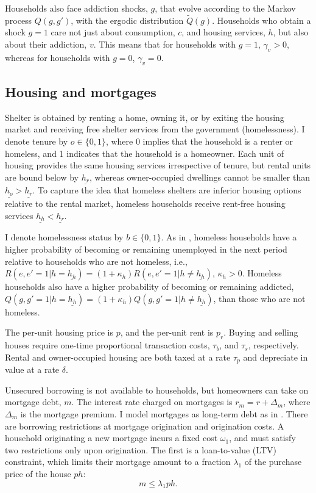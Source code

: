 \documentclass[parskip=full]{article}
\begin{document}
Households also face addiction shocks, $g$, that evolve according to the Markov process $Q(g,g')$, with the ergodic distribution $\tilde{Q}(g)$. Households who obtain a shock $g=1$ care not just about consumption, $c$, and housing services, $h$, but also about their addiction, $v$. This means that for households with $g=1$, $\gamma_{v}>0$, whereas for households with $g=0$, $\gamma_{v}=0$.

\subsection{Housing and mortgages}
Shelter is obtained by renting a home, owning it, or by exiting the housing market and receiving free shelter services from the government (homelessness). I denote tenure by $o\in\{0,1\}$, where 0 implies that the household is a renter or homeless, and 1 indicates that the household is a homeowner. Each unit of housing provides the same housing services irrespective of tenure, but rental units are bound below by $\underline{{h}_r}$, whereas owner-occupied dwellings cannot be smaller than $\underline{{h}_o}>\underline{{h}_r}$. To capture the idea that homeless shelters are inferior housing options relative to the rental market, homeless households receive rent-free housing services $\underline{{h}_h}<\underline{{h}_r}$. 

I denote homelessness status by $b \in \{0,1\}$. As in \citet{az-2024}, homeless households have a higher probability of becoming or remaining unemployed in the next period relative to households who are not homeless, i.e., $R(e,e'=1|h=\underline{{h}_h})=(1+\kappa_{h})R(e,e'=1|h \neq \underline{{h}_h})$, $\kappa_{h}>0$. Homeless households also have a higher probability of becoming or remaining addicted, $Q(g,g'=1|h=\underline{{h}_h})=(1+\kappa_{h})Q(g,g'=1|h \neq \underline{{h}_h})$, than those who are not homeless.

The per-unit housing price is $p$, and the per-unit rent is $p_{r}$. Buying and selling houses require one-time proportional transaction costs, $\tau_{b}$, and $\tau_{s}$, respectively. Rental and owner-occupied housing are both taxed at a rate $\tau_{p}$ and depreciate in value at a rate $\delta$.

Unsecured borrowing is not available to households, but homeowners can take on mortgage debt, $m$. The interest rate charged on mortgages is $r_m =r+\Delta_m$, where $\Delta_m$ is the mortgage premium. I model mortgages as long-term debt as in \citet{kkk-2021}. There are borrowing restrictions at mortgage origination and origination costs. A household originating a new mortgage incurs a fixed cost $\omega_1$, and must satisfy two restrictions only upon origination. The first is a loan-to-value (LTV) constraint, which limits their mortgage amount to a fraction $\lambda_{1}$ of the purchase price of the house $ph$:
\begin{equation}
\label{eq:ltv}
m \leq \lambda_{1} ph.
\end{equation}
\end{document}
